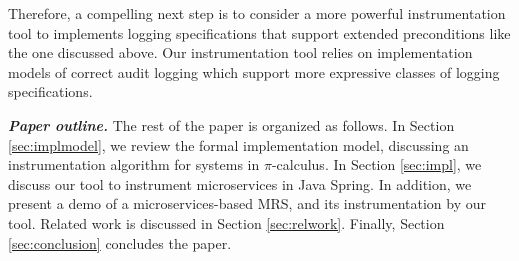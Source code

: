 Therefore, a compelling next step is to consider a more powerful instrumentation tool to implements logging specifications that support extended preconditions like the one discussed above. Our instrumentation tool relies on implementation models of correct audit logging which support more expressive classes of logging specifications.




\textbf{\textit{Paper outline.}}
The rest of the paper is organized as follows. In Section \ref{sec:implmodel}, we review the formal implementation model, discussing an instrumentation algorithm for systems in $\pi$-calculus. In Section \ref{sec:impl}, we discuss our tool to instrument microservices in Java Spring. In addition, we present a demo of a microservices-based MRS, and its instrumentation by our tool. 
Related work is discussed in Section \ref{sec:relwork}. Finally, Section \ref{sec:conclusion} concludes the paper.